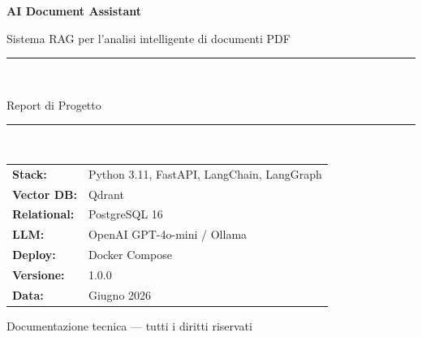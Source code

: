 \documentclass[12pt,a4paper]{report}
\begin{document}
\begin{titlepage}
  \centering
  \vspace*{2cm}
  {\Huge\bfseries\color{primary} AI Document Assistant\par}
  \vspace{0.5cm}
  {\Large\color{gray} Sistema RAG per l'analisi intelligente di documenti PDF\par}
  \vspace{2cm}
  \rule{\linewidth}{0.4pt}\\[0.4cm]
  {\large Report di Progetto\par}
  \rule{\linewidth}{0.4pt}\\[2cm]

  \begin{tabular}{ll}
    \textbf{Stack:}       & Python 3.11, FastAPI, LangChain, LangGraph \\
    \textbf{Vector DB:}   & Qdrant                                      \\
    \textbf{Relational:}  & PostgreSQL 16                               \\
    \textbf{LLM:}         & OpenAI GPT-4o-mini / Ollama                \\
    \textbf{Deploy:}      & Docker Compose                              \\
    \textbf{Versione:}    & 1.0.0                                       \\
    \textbf{Data:}        & Giugno 2026                                 \\
  \end{tabular}

  \vfill
  {\small\color{gray} Documentazione tecnica — tutti i diritti riservati}
\end{titlepage}

\tableofcontents
\clearpage





\end{document}
